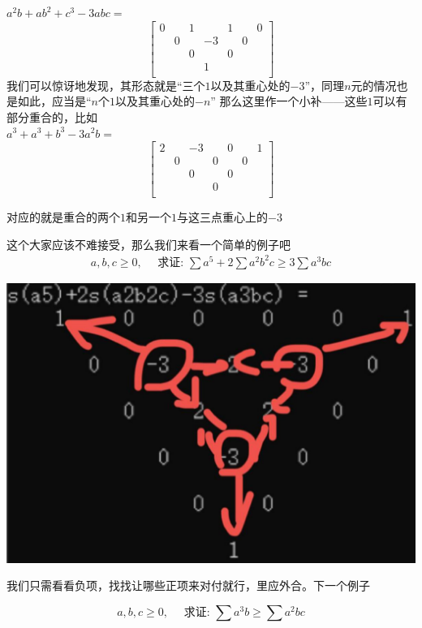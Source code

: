 \documentclass[UTF8]{ctexart}
\begin{document}
$ a^{2}b+ab^{2}+c^{3}-3abc= $
\renewcommand*{\arraystretch}{1.732}\[\left[\begin{matrix}
	0& & 1& &1& & 0\\
	& 0& & -3& &0 &\\
	& & 0& &0& & \\
	& & & 1& & &\\
\end{matrix}\right]\]
我们可以惊讶地发现，其形态就是“三个$ 1 $以及其重心处的$ -3 $”，同理$ n $元的情况也是如此，应当是“$ n $个$ 1 $以及其重心处的$ -n $”
那么这里作一个小补——这些$ 1 $可以有部分重合的，比如\\
$ a^{3}+a^{3}+b^{3}-3a^{2}b= $
\renewcommand*{\arraystretch}{1.732}\[\left[\begin{matrix}
	2& & -3& &0& & 1\\
	& 0& & 0& &0 &\\
	& & 0& &0& & \\
	& & & 0& & &\\
\end{matrix}\right]\]

对应的就是重合的两个$ 1 $和另一个$ 1 $与这三点重心上的$ -3 $

这个大家应该不难接受，那么我们来看一个简单的例子吧
$$
\begin{gathered}
	a, b, c \geq 0, \quad \text { 求证: } \sum a^{5}+2 \sum a^{2} b^{2} c \geq 3 \sum a^{3} b c
\end{gathered}
$$
\begin{center}
	\includegraphics[width=0.4\linewidth]{120}
\end{center}

我们只需看看负项，找找让哪些正项来对付就行，里应外合。下一个例子

$$ a, b, c \geq 0, \quad \text { 求证: } \sum a^{3} b \geq \sum a^{2} b c
$$
\end{document}
